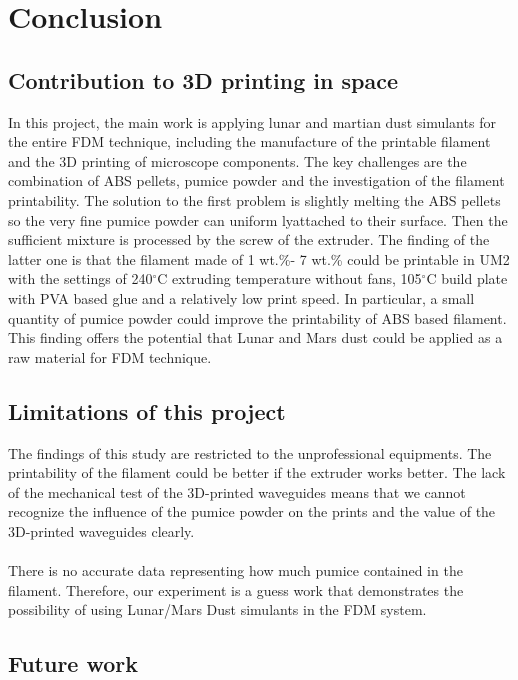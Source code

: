 \chapter{Conclusion}
\renewcommand{\baselinestretch}{\mystretch}
\label{chap:Conclu}

\section{Contribution to 3D printing in space}
In this project, the main work is applying lunar and martian dust simulants for the entire FDM technique, including the manufacture of the printable filament and the 3D printing of microscope components. The key challenges are the combination of ABS pellets, pumice powder and the investigation of the filament printability. The solution to the first problem is slightly melting the ABS pellets so the very fine pumice powder can uniform lyattached to their surface. Then the sufficient mixture is processed by the screw of the extruder. The finding of the latter one is that the filament made of 1 wt.\%- 7 wt.\% could be printable in UM2 with the settings of 240$^{\circ}$C extruding temperature without fans, 105$^{\circ}$C build plate with PVA based glue and a relatively low print speed. In particular, a small quantity of pumice powder could improve the printability of ABS based filament. This finding offers the potential that Lunar and Mars dust could be applied as a raw material for FDM technique. 

\section{Limitations of this project}
The findings of this study are restricted to the unprofessional equipments. The printability of the filament could be better if the extruder works better. The lack of the mechanical test of the 3D-printed waveguides means that we cannot recognize the influence of the pumice powder on the prints and the value of the 3D-printed waveguides clearly. \\
\\
There is no accurate data representing how much pumice contained in the filament. Therefore, our experiment is a guess work that demonstrates the possibility of using Lunar/Mars Dust simulants in the FDM system.

\section{Future work}

